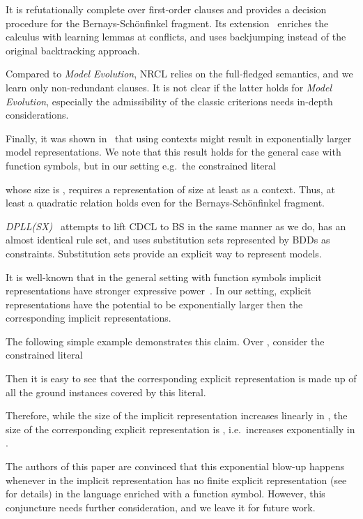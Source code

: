 \documentclass[a4paper]{article}
\newcommand{\mEPR}{Bernays-Sch\"onfinkel}
\newcommand{\mEPRs}{BS}
\newcommand{\ie}{i.e.\ }
\newcommand{\eg}{e.g.\ }
\begin{document}
{It is refutationally complete over first-order clauses and provides a 
decision procedure for the {\mEPR} fragment. 
Its extension~\cite{ModelEvolutionLemma06} enriches the calculus with learning lemmas at conflicts, 
and uses backjumping instead of the original backtracking approach. 

Compared to \emph{Model Evolution}, NRCL relies on the full-fledged semantics,  
and we learn only non-redundant clauses.
It is not clear if the latter holds for \emph{Model Evolution}, 
especially the admissibility of the classic criterions
needs in-depth considerations.

Finally, it was shown in~\cite{FermullerCADE05} that using contexts might result in exponentially larger model representations.
We note that this result holds for the general case with function symbols, but in our setting \eg the constrained literal

whose size is , requires a representation of size at least  as a context.
Thus, at least a quadratic relation holds even for the {\mEPR} fragment.

\emph{DPLL(SX)}~\cite{DPLLSX10} attempts to lift CDCL to {\mEPRs} in the same manner as we do, 
has an almost identical rule set, 
and uses substitution sets represented by BDDs as constraints. 
Substitution sets provide an explicit way to represent models. 

It is well-known that in the general setting with function symbols implicit representations have stronger expressive power~\cite{Pichler03}\cite{LassezM87}.
In our setting, explicit representations have the potential to be exponentially larger 
then the corresponding implicit representations.

The following simple example demonstrates this claim.
Over , consider the constrained literal

Then it is easy to see that the corresponding explicit representation is made up of all the ground instances covered by this literal.

Therefore, while the size of the implicit representation increases linearly in , the size of the corresponding explicit representation
is , \ie increases exponentially in .

The authors of this paper are convinced that this exponential blow-up happens whenever in the implicit representation has 
no finite explicit representation (see \cite{Pichler03}\cite{LassezM87} for details) in the language enriched with a function symbol. 
However, this conjuncture needs further consideration, and we leave it for future work.

}
\end{document}
